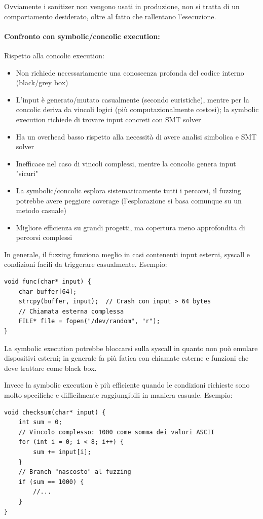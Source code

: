 Ovviamente i sanitizer non vengono usati in produzione, non si tratta di un comportamento desiderato, oltre al fatto che rallentano l'esecuzione.

\paragraph{Confronto con symbolic/concolic execution:} Rispetto alla concolic execution: 
\begin{itemize}
    \item Non richiede necessariamente una conoscenza profonda del codice interno (black/grey box)
    
    \item L'input è generato/mutato casualmente (secondo euristiche), mentre per la concolic deriva da vincoli logici (più computazionalmente costosi); la symbolic execution richiede di trovare input concreti con SMT solver
    
    \item Ha un overhead basso rispetto alla necessità di avere analisi simbolica e SMT solver
    
    \item Inefficace nel caso di vincoli complessi, mentre la concolic genera input "sicuri"
    
    \item La symbolic/concolic esplora sistematicamente tutti i percorsi, il fuzzing potrebbe avere peggiore coverage (l'esplorazione si basa comunque su un metodo casuale)
    
    \item Migliore efficienza su grandi progetti, ma copertura meno approfondita di percorsi complessi
\end{itemize}

In generale, il fuzzing funziona meglio in casi contenenti input esterni, syscall e condizioni facili da triggerare casualmente. Esempio:
\begin{verbatim}
void func(char* input) {
    char buffer[64];
    strcpy(buffer, input);  // Crash con input > 64 bytes
    // Chiamata esterna complessa
    FILE* file = fopen("/dev/random", "r");
}
\end{verbatim}
La symbolic execution potrebbe bloccarsi sulla syscall in quanto non può emulare dispositivi esterni; in generale fa più fatica con chiamate esterne e funzioni che deve trattare come black box.

Invece la symbolic execution è più efficiente quando le condizioni richieste sono molto specifiche e difficilmente raggiungibili in maniera casuale. Esempio:
\begin{verbatim}
void checksum(char* input) {
    int sum = 0;
    // Vincolo complesso: 1000 come somma dei valori ASCII
    for (int i = 0; i < 8; i++) {
        sum += input[i]; 
    }
    // Branch "nascosto" al fuzzing
    if (sum == 1000) {
        //...
    }
}
\end{verbatim}

